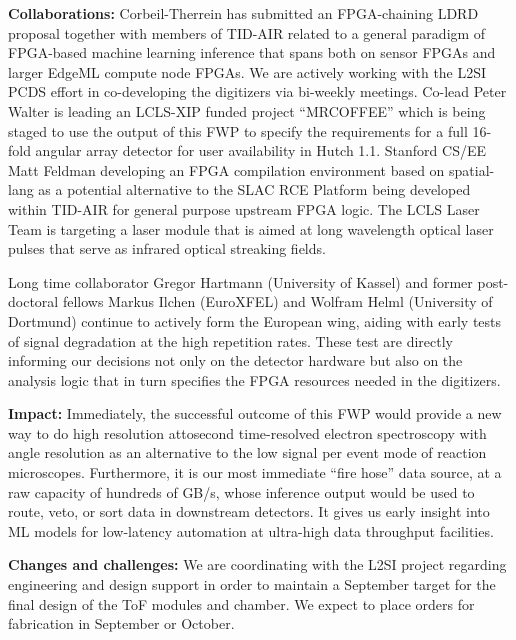 \documentclass[aps]{revtex4}
\begin{document}
\textbf{Collaborations: }\noindent
Corbeil-Therrein has submitted an FPGA-chaining LDRD proposal together with members of TID-AIR related to a general paradigm of FPGA-based machine learning inference that spans both on sensor FPGAs and larger EdgeML compute node FPGAs.
We are actively working with the L2SI PCDS effort in co-developing the digitizers via bi-weekly meetings.
Co-lead Peter Walter is leading an LCLS-XIP funded project ``MRCOFFEE'' which is being staged to use the output of this FWP to specify the requirements for a full 16-fold angular array detector for user availability in Hutch 1.1.
Stanford CS/EE Matt Feldman developing an FPGA compilation environment based on spatial-lang as a potential alternative to the SLAC RCE Platform being developed within TID-AIR for general purpose upstream  FPGA logic.
The LCLS Laser Team is targeting a laser module that is aimed at long wavelength optical laser pulses that serve as infrared optical streaking fields.

Long time collaborator Gregor Hartmann (University of Kassel) and former post-doctoral fellows Markus Ilchen (EuroXFEL) and Wolfram Helml (University of Dortmund) continue to actively form the European wing, aiding with early tests of signal degradation at the high repetition rates.
These test are directly informing our decisions not only on the detector hardware but also on the analysis logic that in turn specifies the FPGA resources needed in the digitizers.

\textbf{Impact: }
Immediately, the successful outcome of this FWP would provide a new way to do high resolution attosecond time-resolved electron spectroscopy with angle resolution as an alternative to the low signal per event mode of reaction microscopes.  
Furthermore, it is our most immediate ``fire hose'' data source, at a raw capacity of hundreds of GB/s, whose inference output would be used to route, veto, or sort data in downstream detectors.
It gives us early insight into ML models for low-latency automation at ultra-high data throughput facilities.  

\textbf{Changes and challenges: }
We are coordinating with the L2SI project regarding engineering and design support in order to maintain a September target for the final design of the ToF modules and chamber.
We expect to place orders for fabrication in September or October.
\end{document}
